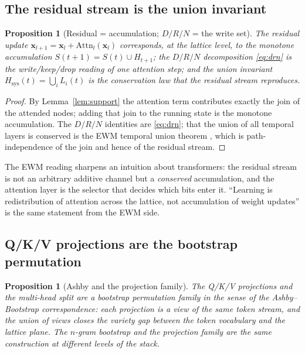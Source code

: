 \documentclass[11pt,a4paper]{article}
\newtheorem{proposition}[principle]{Proposition}
\theoremstyle{remark}
\newcommand{\HLL}{\ensuremath{H}}                      %
\newcommand{\Attn}{\ensuremath{\mathrm{Attn}}}          %
\newcommand{\xx}{\ensuremath{\mathbf{x}}}               %
\begin{document}
\subsection{The residual stream is the union invariant}

\begin{proposition}[Residual = accumulation; $D/R/N$ = the write set]
\label{prop:residual}
The residual update $\xx_{l+1}=\xx_l+\Attn_l(\xx_l)$ corresponds, at the
lattice level, to the monotone accumulation $S(t{+}1)=S(t)\cup \HLL_{t+1}$; the
$D/R/N$ decomposition \eqref{eq:drn} is the write/keep/drop reading of one
attention step; and the union invariant
$H_{\mathrm{sys}}(t)=\bigcup_i L_i(t)$ is the conservation law that the residual
stream reproduces.
\end{proposition}

\begin{proof}
By Lemma~\ref{lem:support} the attention term contributes exactly the join of
the attended nodes; adding that join to the running state is the monotone
accumulation. The $D/R/N$ identities are \eqref{eq:drn}; that the union of all
temporal layers is conserved is the EWM temporal union theorem
\cite{ewm2026}, which is path-independence of the join and hence of the residual
stream.
\end{proof}

The EWM reading sharpens an intuition about transformers: the residual stream is
not an arbitrary additive channel but a \emph{conserved} accumulation, and the
attention layer is the selector that decides which bits enter it. ``Learning is
redistribution of attention across the lattice, not accumulation of weight
updates'' \cite{ewm2026} is the same statement from the EWM side.

\subsection{Q/K/V projections are the bootstrap permutation}

\begin{proposition}[Ashby and the projection family]
\label{prop:bootstrap}
The Q/K/V projections and the multi-head split are a bootstrap permutation
family in the sense of the Ashby--Bootstrap correspondence: each projection is a
view of the same token stream, and the union of views closes the variety gap
between the token vocabulary and the lattice plane. The $n$-gram bootstrap and
the projection family are the same construction at different levels of the
stack.
\end{proposition}
\end{document}
